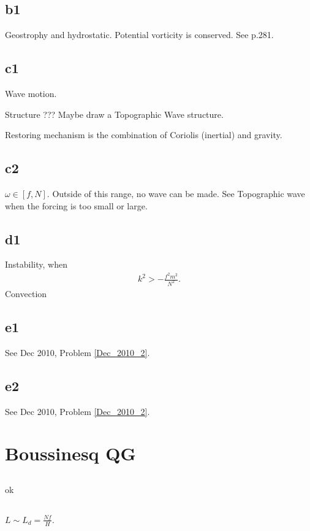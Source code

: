 \documentclass[11pt,letterpaper]{book}
\theoremstyle{definition}
\begin{document}
\subsection{b1}
Geostrophy and hydrostatic. Potential vorticity is conserved. See \cite{vallis} p.281.

\subsection{c1}
Wave motion.

Structure ??? Maybe draw a Topographic Wave structure. 

Restoring mechanism is the combination of Coriolis (inertial) and gravity.

\subsection{c2}
$\omega \in [f,N]$. Outside of this range, no wave can be made. See Topographic wave when the forcing is too small or large. 

\subsection{d1}
Instability, when
\begin{align*}
    k^2 > -\frac{f^2m^2}{N^2}.
\end{align*}
Convection

\subsection{e1}
See Dec 2010, Problem \ref{Dec_2010_2}.

\subsection{e2}
See Dec 2010, Problem \ref{Dec_2010_2}.

\section{Boussinesq QG}
\subsection{}
ok

\subsection{}
$L\sim L_d = \frac{Nf}{H}$.
\end{document}
